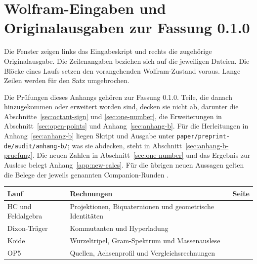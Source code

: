 \section{Wolfram-Eingaben und Originalausgaben zur Fassung 0.1.0}
\label{app:wolfram-output}

Die Fenster zeigen links das Eingabeskript und rechts die zugehörige Originalausgabe. Die Zeilenangaben beziehen sich auf die jeweiligen Dateien. Die Blöcke eines Laufs setzen den vorangehenden Wolfram-Zustand voraus. Lange Zeilen werden für den Satz umgebrochen.

Die Prüfungen dieses Anhangs gehören zur Fassung 0.1.0. Teile, die danach hinzugekommen oder erweitert worden sind, decken sie
nicht ab, darunter die Abschnitte~\ref{sec:octant-sign} und \ref{sec:one-number}, die Erweiterungen in Abschnitt~\ref{sec:open-points} und
Anhang~\ref{sec:anhang-b}. Für die Herleitungen in
Anhang~\ref{sec:anhang-b} liegen Skript und Ausgabe unter \texttt{paper/\allowbreak preprint-de/\allowbreak audit/\allowbreak anhang-b/}; was sie
abdecken, steht in Abschnitt~\ref{sec:anhang-b-pruefung}. Die neuen Zahlen in Abschnitt~\ref{sec:one-number} und das Ergebnis zur
Auslese belegt Anhang~\ref{app:new-calcs}. Für die übrigen neuen Aussagen gelten die Belege der jeweils genannten
Companion-Runden \cite{companion,layers}.

\medskip
\noindent
\begin{tabular}{@{}lp{.59\linewidth}r@{}}
\hline
\textbf{Lauf} & \textbf{Rechnungen} & \textbf{Seite} \\
\hline
HC und Feldalgebra & Projektionen, Biquaternionen und geometrische Identitäten & \pageref{app:wl-core} \\
Dixon-Träger & Kommutanten und Hyperladung & \pageref{app:wl-dixon} \\
Koide & Wurzeltripel, Gram-Spektrum und Massenauslese & \pageref{app:wl-koide} \\
OP5 & Quellen, Achsenprofil und Vergleichsrechnungen & \pageref{app:wl-op5} \\
\hline
\end{tabular}

